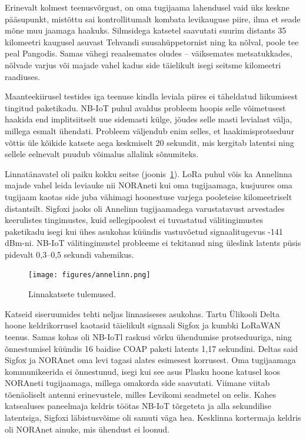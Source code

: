 \documentclass[12pt]{article}
\begin{document}
    Erinevalt kolmest teenusvõrgust, on oma tugijaama lahendusel vaid üks keskne pääsupunkt, mistõttu sai kontrollitumalt kombata levikauguse piire, ilma et seade mõne muu jaamaga haakuks.
    Silmsidega katsetel saavutati suurim distants 35 kilomeetri kaugusel asuvast Tehvandi suusahüppetornist ning ka nõlval, poole tee peal Pangodis.
    Samas vähegi reaalsemates oludes -- väiksemates metsatukkades, nõlvade varjus või majade vahel kadus side täielikult isegi seitsme kilomeetri raadiuses.

    Maanteekiirusel testides iga teenuse kindla leviala piires ei täheldatud liikumisest tingitud paketikadu.
    NB-IoT puhul avaldus probleem hoopis selle võimetusest haakida end implitsiitselt uue sidemasti külge, jõudes selle masti levialast välja, millega esmalt ühendati.
    Probleem väljendub enim selles, et haakimisprotseduur võttis üle kõikide katsete aega keskmiselt 20 sekundit, mis kergitab latentsi ning sellele eelnevalt puudub võimalus allalink sõnumiteks.

    Linnatänavatel oli paiku kokku seitse (joonis~\ref{fig:annelinn}).
    LoRa puhul võis ka Annelinna majade vahel leida leviauke nii NORAneti kui oma tugijaamaga, kusjuures oma tugijaam kaotas side juba vähimagi hoonestuse varjega pooleteise kilomeetriselt distantsilt.
    Sigfoxi jaoks oli Annelinn tugijaamadega varustatavust arvestades keerulistes tingimustes, kuid sellegipoolest ei tuvastatud välitingimustes paketikadu isegi kui ühes asukohas küündis vastuvõetud signaalitugevus -141 dBm-ni.
    NB-IoT välitingimustel probleeme ei tekitanud ning üleslink latents püsis pidevalt 0,3--0,5 sekundi vahemikus.

    \begin{figure} [p]
        \begin{center}
            \texttt{[image: figures/annelinn.png]}
            \caption{Linnakatsete tulemused.}
            \label{fig:annelinn}
        \end{center}
    \end{figure}

    Katseid siseruumides tehti neljas linnasiseses asukohas.
    Tartu Ülikooli Delta hoone keldrikorrusel kaotasid täielikult signaali Sigfox ja kumbki LoRaWAN teenus.
    Samas kohas oli NB-IoTl raskusi võrku ühendumise protseduuriga, ning õnnestumisel küündis 16 baidise COAP paketi latents 1,17 sekundini.
    Deltas said Sigfox ja NORAnet oma levi tagasi alates esimesest korrusest.
    Oma tugijaamaga kommunikeerida ei õnnestunud, isegi kui see asus Plasku hoone katusel koos NORAneti tugijaamaga, millega omakorda side saavutati.
    Viimane viitab tõenäoliselt antenni erinevustele, milles Levikomi seadmetel on eelis.
    Kahes katsealuses paneelmaja keldris töötas NB-IoT tõrgeteta ja alla sekundilise latentsiga, Sigfoxi läbistusvõime oli samuti väga hea.
    Kesklinna kortermaja keldris oli NORAnet ainuke, mis ühendust ei loonud.
\end{document}
